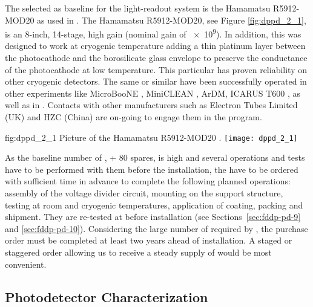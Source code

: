 The  %
selected as baseline for the light-readout system is the Hamamatsu R5912-MOD20  as used in . The Hamamatsu R5912-MOD20, see Figure \ref{fig:dppd_2_1}, is an 8-inch, 14-stage, high gain  (nominal gain of \num{e9}). In addition, this  was designed to work at cryogenic temperature adding a thin platinum layer between the photocathode and the borosilicate glass envelope to preserve the conductance of the photocathode at low temperature. This particular  has proven reliability on other cryogenic detectors. The same or similar  have been successfully operated in other \lar experiments like MicroBooNE \cite{microboone}, MiniCLEAN \cite{miniclean}, ArDM, ICARUS T600 \cite{icarus}, as well as in  \cite{protoDUNDP-tdr}. Contacts with other manufacturers such as Electron Tubes Limited (UK) \cite{electrontubeslim} and HZC (China) \cite{hzc} are on-going to engage them in the program.

\begin{dunefigure}{fig:dppd_2_1}
{Picture of the Hamamatsu R5912-MOD20  \cite{hamamatsu-5912}.}
\texttt{[image: dppd\_2\_1]}
\end{dunefigure}

As the baseline number of , \dpnumpmtch + \num{80} spares, is high and several operations and tests have to be performed with them before the installation, the  have to be ordered with sufficient time in advance to complete the following planned operations: assembly of the voltage divider circuit, mounting on the support structure, testing at room and cryogenic temperatures, application of  coating, packing and shipment. They are %
re-tested at \surf before installation (see Sections~\ref{sec:fddp-pd-9} and \ref{sec:fddp-pd-10}). Considering the large number of  required by \dual {}, the purchase order %
must be completed at least two years ahead of installation. A staged or staggered order allowing us to receive a steady supply of  would be most convenient. %

\subsection{Photodetector Characterization}
\label{sec:fddp-pd-2.2}


